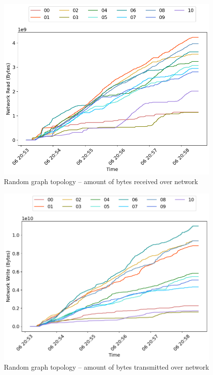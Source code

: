 \begin{minipage}{0.5\linewidth}
\begin{figure}[H]
\captionsetup{justification=centering,width=0.8\linewidth}
\includegraphics[width=\linewidth]{figures/graph-random/net_read.png}
\caption{Random graph topology -- amount of bytes received over network}
\label{fig:graph-random-cpu_usage}
\end{figure}
\end{minipage}
\begin{minipage}{0.5\linewidth}
\begin{figure}[H]
\captionsetup{justification=centering,width=0.8\linewidth}
\includegraphics[width=\linewidth]{figures/graph-random/net_write.png}
\caption{Random graph topology -- amount of bytes transmitted over network}
\label{fig:graph-random-mem_usage}
\end{figure}
\end{minipage}


